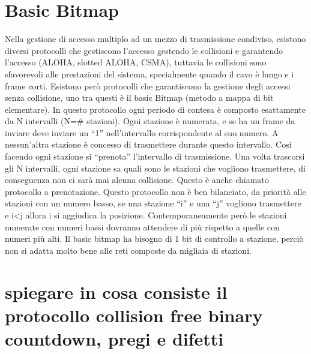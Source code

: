  


\section{Basic Bitmap}

Nella gestione di accesso multiplo ad un mezzo di trasmissione condiviso, esistono diversi protocolli che gestiscono l’accesso gestendo le collisioni e garantendo l’accesso (ALOHA, slotted ALOHA, CSMA), tuttavia le collisioni sono sfavorevoli alle prestazioni del sistema, specialmente quando il cavo è lungo e i frame corti.
Esistono però protocolli che garantiscono la gestione degli accessi senza collisione, uno tra questi è il basic Bitmap (metodo a mappa di bit elementare). In questo protocollo ogni periodo di contesa è composto esattamente da N intervalli (N=\# stazioni). Ogni stazione è numerata, e se ha un frame da inviare deve inviare un “1” nell’intervallo corrispondente al suo numero. A nessun’altra stazione è concesso di trasmettere durante questo intervallo. Cosi facendo ogni stazione si “prenota” l’intervallo di trasmissione. Una volta trascorsi gli N intervalli, ogni stazione sa quali sono le stazioni che vogliono trasmettere, di conseguenza non ci sarà mai alcuna collisione.
Questo è anche chiamato protocollo a prenotazione.
Questo protocollo non è ben bilanciato, da priorità alle stazioni con un numero basso, se una stazione “i” e una “j” vogliono trasmettere e i<j allora i si aggiudica la posizione.
Contemporaneamente però le stazioni numerate con numeri bassi dovranno attendere di più rispetto a quelle con numeri più alti.
Il basic bitmap ha bisogno di 1 bit di controllo a stazione, perciò non si adatta molto bene alle reti composte da migliaia di stazioni.

\section{spiegare in cosa consiste il protocollo collision free binary countdown, pregi e difetti}

